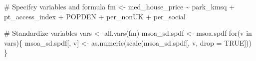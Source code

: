 \documentclass[
  letterpaper,
]{scrbook}
\newenvironment{Shaded}{\begin{snugshade}}{\end{snugshade}}
\newcommand{\AttributeTok}[1]{\textcolor[rgb]{0.40,0.45,0.13}{#1}}
\newcommand{\CommentTok}[1]{\textcolor[rgb]{0.37,0.37,0.37}{#1}}
\newcommand{\ConstantTok}[1]{\textcolor[rgb]{0.56,0.35,0.01}{#1}}
\newcommand{\ControlFlowTok}[1]{\textcolor[rgb]{0.00,0.23,0.31}{#1}}
\newcommand{\FunctionTok}[1]{\textcolor[rgb]{0.28,0.35,0.67}{#1}}
\newcommand{\NormalTok}[1]{\textcolor[rgb]{0.00,0.23,0.31}{#1}}
\newcommand{\OtherTok}[1]{\textcolor[rgb]{0.00,0.23,0.31}{#1}}
\newcommand{\SpecialCharTok}[1]{\textcolor[rgb]{0.37,0.37,0.37}{#1}}
\begin{document}
\begin{Shaded}
\begin{Highlighting}[]
\CommentTok{\# Specifcy variables and formula}
\NormalTok{fm }\OtherTok{\textless{}{-}}\NormalTok{ med\_house\_price }\SpecialCharTok{\textasciitilde{}}\NormalTok{ park\_kmsq }\SpecialCharTok{+}\NormalTok{ pt\_access\_index }\SpecialCharTok{+}\NormalTok{ POPDEN }\SpecialCharTok{+}\NormalTok{ per\_nonUK }\SpecialCharTok{+}\NormalTok{ per\_social}

\CommentTok{\# Standardize variables}
\NormalTok{vars }\OtherTok{\textless{}{-}} \FunctionTok{all.vars}\NormalTok{(fm)}
\NormalTok{msoa\_sd.spdf }\OtherTok{\textless{}{-}}\NormalTok{ msoa.spdf}
\ControlFlowTok{for}\NormalTok{(v }\ControlFlowTok{in}\NormalTok{ vars)\{}
\NormalTok{  msoa\_sd.spdf[, v] }\OtherTok{\textless{}{-}} \FunctionTok{as.numeric}\NormalTok{(}\FunctionTok{scale}\NormalTok{(msoa\_sd.spdf[, v, }\AttributeTok{drop =} \ConstantTok{TRUE}\NormalTok{]))}
\NormalTok{\}}
\end{Highlighting}
\end{Shaded}
\end{document}
